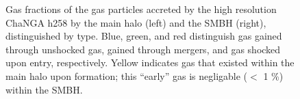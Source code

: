 \documentclass[manuscript]{aastex}
\begin{document}
\begin{figure}
\centerline{}
\caption[]{Gas fractions of the gas particles accreted by the high resolution ChaNGA h258 by the main halo (left) and the SMBH (right), distinguished by type. Blue, green, and red distinguish gas gained through unshocked gas, gained through mergers, and gas shocked upon entry, respectively. Yellow indicates gas that existed within the main halo upon formation; this ``early'' gas is negligable ($<$ 1 \%) within the SMBH.}
\label{h277stackfrac} 
\end{figure}



\end{document}
